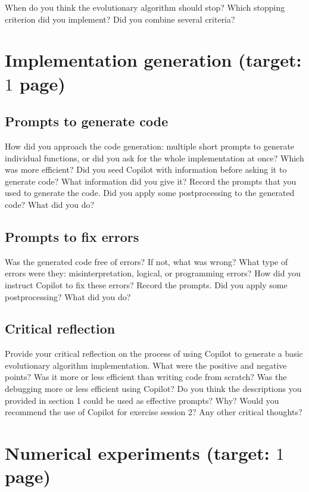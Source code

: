 \documentclass[a4paper,10pt]{article}
\newcommand{\ReplaceMe}[1]{{\color{blue}#1}}
\begin{document}
\ReplaceMe{When do you think the evolutionary algorithm should stop? Which stopping criterion did you implement? Did you combine several criteria?}

\section{Implementation generation \hfill(target: $1$ page)}

\subsection{Prompts to generate code}
\ReplaceMe{How did you approach the code generation: multiple short prompts to generate individual functions, or did you ask for the whole implementation at once? Which was more efficient? Did you seed Copilot with information before asking it to generate code? What information did you give it? Record the prompts that you used to generate the code. Did you apply some postprocessing to the generated code? What did you do?}

\subsection{Prompts to fix errors}
\ReplaceMe{Was the generated code free of errors? If not, what was wrong? What type of errors were they: misinterpretation, logical, or programming errors? How did you instruct Copilot to fix these errors? Record the prompts. Did you apply some postprocessing? What did you do?}

\subsection{Critical reflection}
\ReplaceMe{Provide your critical reflection on the process of using Copilot to generate a basic evolutionary algorithm implementation. What were the positive and negative points? Was it more or less efficient than writing code from scratch? Was the debugging more or less efficient using Copilot? Do you think the descriptions you provided in section 1 could be used as effective prompts? Why? Would you recommend the use of Copilot for exercise session 2? Any other critical thoughts?}


\section{Numerical experiments \hfill(target: $1$ page)}
\end{document}
